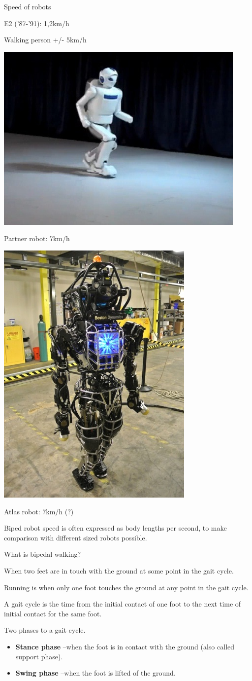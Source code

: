 \documentclass[compress]{beamer}
\begin{document}
\begin{frame}{Speed of robots}
\begin{center}
    E2 ('87-'91): 1,2km/h


    Walking person +/- 5km/h

        \includegraphics[width=0.3\linewidth]{image10}

    Partner robot: 7km/h

        \includegraphics[width=0.3\linewidth]{image11}

    Atlas robot: 7km/h (?)

    \end{center}
    Biped robot speed is often expressed as body lengths per second, to make
    comparison with different sized robots possible.

\end{frame}

\begin{frame}{What is bipedal walking?}

    When two feet are in touch with the ground at some point in the gait
    cycle.

    Running is when only one foot touches the ground at any point in the
    gait cycle.

    A gait cycle is the time from the initial contact of one foot to the
    next time of initial contact for the same foot.

    Two phases to a gait cycle.

    \begin{itemize}

        \item \textbf{Stance phase} --when the foot is in contact with the ground
            (also called support phase).
        \item \textbf{Swing phase} --when the foot is lifted of the ground.
    \end{itemize}

\end{frame}
\end{document}
